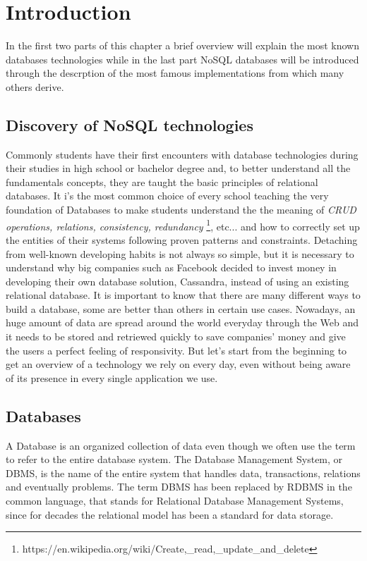 \chapter{Introduction}
\label{cha:intro}

In the first two parts of this chapter a brief overview will explain the most known databases technologies while in the last part NoSQL databases will be introduced through the descrption of the most famous implementations from which many others derive.


\section{Discovery of NoSQL technologies}
\label{sec:context}

Commonly students have their first encounters with database technologies during their studies in high school or bachelor degree and, to better understand all the fundamentals concepts, they are taught the basic principles of relational databases.
It i’s the most common choice of every school teaching the very foundation of Databases to make students understand the the meaning of \textit{CRUD operations, relations, consistency, redundancy} \footnote{https://en.wikipedia.org/wiki/Create,\_read,\_update\_and\_delete}, etc... and how to correctly set up the entities of their systems following proven patterns and constraints.
Detaching from well-known developing habits is not always so simple, but it is necessary to understand why big companies such as Facebook decided to invest money in developing their own database solution, Cassandra, instead of using an existing relational database.
It is important to know that there are many different ways to build a database, some are better than others in certain use cases. Nowadays, an huge amount of data are spread around the world everyday through the Web and it needs to be stored and retriewed quickly to save companies' money and give the users a perfect feeling of responsivity\cite{}.
But let’s start from the beginning to get an overview of a technology we rely on every day, even without being aware of its presence in every single application we use.


\section{Databases}
\label{sec:problem}

A Database is an organized collection of data even though we often use the term to refer to the entire database system. The Database Management System, or DBMS, is the name of the entire system that handles data, transactions, relations and eventually problems.
The term DBMS has been replaced by RDBMS in the common language, that stands for Relational Database Management Systems, since for decades the relational model has been a standard for data storage.


